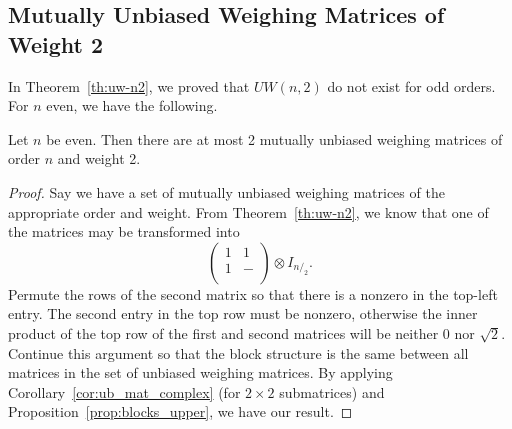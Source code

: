 
\subsection[Weight 2]{Mutually Unbiased Weighing Matrices of Weight 2}
\label{sec:muwm-w2}

In Theorem~\ref{th:uw-n2}, we proved that $UW(n,2)$ do not exist for odd orders. For $n$ even, we have the following.

\begin{lemma} \label{lem:even-2}
 Let $n$ be even. Then there are at most 2 mutually unbiased weighing matrices of order $n$ and weight 2.
 \begin{proof}
  Say we have a set of mutually unbiased weighing matrices of the appropriate order and weight. From Theorem~\ref{th:uw-n2}, we know that one of the matrices may be transformed into $$\left(
\begin{array}{cc}
 1 & 1 \\
 1 & - \\
\end{array}
\right) \otimes I_{n/_2}
.$$ Permute the rows of the second matrix so that there is a nonzero in the top-left entry. The second entry in the top row must be nonzero, otherwise the inner product of the top row of the first and second matrices will be neither 0 nor $\sqrt{2}$. Continue this argument so that the block structure is the same between all matrices in the set of unbiased weighing matrices. By applying Corollary~\ref{cor:ub_mat_complex} (for $2 \times 2$ submatrices) and Proposition~\ref{prop:blocks_upper}, we have our result.
 \end{proof}

\end{lemma}

